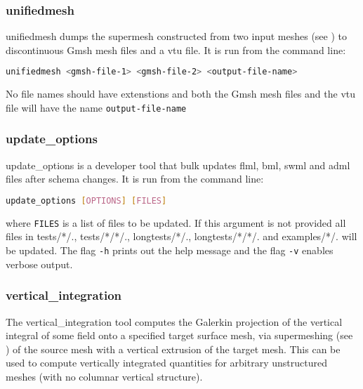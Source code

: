 
\subsubsection{unifiedmesh}
\label{sec:unifiedmesh}
unifiedmesh dumps the supermesh constructed from two input meshes (see \citet{farrell2009a,farrell2010a}) to discontinuous Gmsh mesh files and a vtu file. It is run from the command line:
\begin{lstlisting}[language = Bash]
unifiedmesh <gmsh-file-1> <gmsh-file-2> <output-file-name>
\end{lstlisting}
No file names should have extenstions and both the Gmsh mesh files and the vtu file will have the name \lstinline[language = Bash]+output-file-name+


\subsubsection{update\_options}
\label{sec:update_options}
update\_options is a developer tool that bulk updates flml, bml, swml and adml files after schema changes. It is run from the command line:
\begin{lstlisting}[language = Bash]
update_options [OPTIONS] [FILES]
\end{lstlisting}
where \lstinline+FILES+ is a list of files to be updated. If this argument is not provided all files in tests/*/., tests/*/*/., longtests/*/., longtests/*/*/. and examples/*/. will be updated.
The flag \lstinline[language = Bash]+-h+ prints out the help message and the flag \lstinline[language = Bash]+-v+ enables verbose output.


\subsubsection{vertical\_integration}
\label{sec:vertical_integration}

The vertical\_integration tool computes the Galerkin projection of the vertical
integral of some field onto a specified target surface mesh, via supermeshing (see \citet{farrell2009a,farrell2010a})
of the source mesh with a vertical extrusion of the target mesh. This can be used to
compute vertically integrated quantities for arbitrary unstructured meshes (with
no columnar vertical structure).

